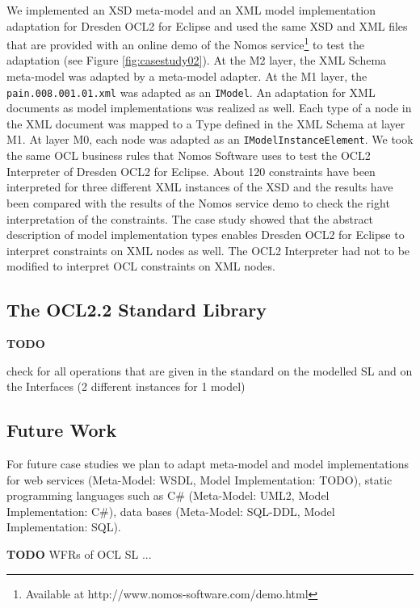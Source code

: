 We implemented an XSD meta-model and an XML model implementation adaptation for Dresden OCL2 for Eclipse and used the same XSD and XML files that are provided with an online demo of the Nomos service\footnote{Available at http://www.nomos-software.com/demo.html} to test the adaptation (see Figure \ref{fig:casestudy02}). At the M2 layer, the XML Schema meta-model was adapted by a meta-model adapter. At the M1 layer, the \texttt{pain.008.001.01.xml} was adapted as an \texttt{IModel}. An adaptation for XML documents as model implementations was realized as well. Each type of a node in the XML document was mapped to a Type defined in the XML Schema at layer M1. At layer M0, each node was adapted as an \texttt{IModelInstanceElement}. We took the same OCL business rules that Nomos Software uses to test the OCL2 Interpreter of Dresden OCL2 for Eclipse. About 120 constraints have been interpreted for three different XML instances of the XSD and the results have been compared with the results of the Nomos service demo to check the right interpretation of the constraints. The case study showed that the abstract description of model implementation types enables Dresden OCL2 for Eclipse to interpret constraints on XML nodes as well. The OCL2 Interpreter had not to be modified to interpret OCL constraints on XML nodes.


\subsection{The OCL2.2 Standard Library}

\textbf{TODO}

check for all operations that are given in the standard on the modelled SL and on the Interfaces (2 different instances for 1 model)


\subsection{Future Work}

For future case studies we plan to adapt meta-model and model implementations for web services (Meta-Model: WSDL, Model Implementation: TODO), static programming languages such as C\# (Meta-Model: UML2, Model Implementation: C\#), data bases (Meta-Model: SQL-DDL, Model Implementation: SQL). 

\textbf{TODO} WFRs of OCL SL ...

